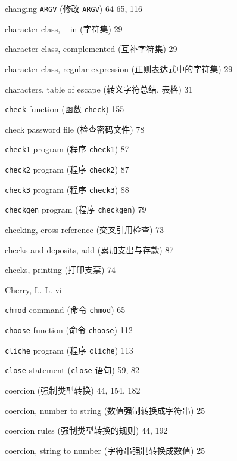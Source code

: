 \begin{multicols}{2}
\hangindent=2pc  changing \verb'ARGV' (修改 \verb'ARGV') 64-65, 116

\hangindent=2pc  character class, \verb'-' in (字符集) 29

\hangindent=2pc  character class, complemented (互补字符集) 29

\hangindent=2pc  character class, regular expression
(正则表达式中的字符集) 29

\hangindent=2pc  characters, table of escape (转义字符总结,
表格) 31

\hangindent=2pc  \verb'check' function (函数 \verb'check') 155

\hangindent=2pc  check password file (检查密码文件) 78

\hangindent=2pc  \verb'check1' program (程序 \verb'check1') 87

\hangindent=2pc  \verb'check2' program (程序 \verb'check2') 87

\hangindent=2pc  \verb'check3' program (程序 \verb'check3') 88

\hangindent=2pc  \verb'checkgen' program (程序 \verb'checkgen') 79

\hangindent=2pc  checking, cross-reference (交叉引用检查) 73

\hangindent=2pc  checks and deposits, add (累加支出与存款) 87

\hangindent=2pc  checks, printing (打印支票) 74

\hangindent=2pc  Cherry, L. L. vi

\hangindent=2pc  \verb'chmod' command (命令 \verb'chmod') 65

\hangindent=2pc  \verb'choose' function (命令 \verb'choose') 112

\hangindent=2pc  \verb'cliche' program (程序 \verb'cliche') 113

\hangindent=2pc  \verb'close' statement (\verb'close' 语句) 59, 82

\hangindent=2pc  coercion (强制类型转换) 44, 154, 182

\hangindent=2pc  coercion, number to string
(数值强制转换成字符串) 25

\hangindent=2pc  coercion rules (强制类型转换的规则) 44, 192

\hangindent=2pc  coercion, string to number
(字符串强制转换成数值) 25


\end{multicols}
